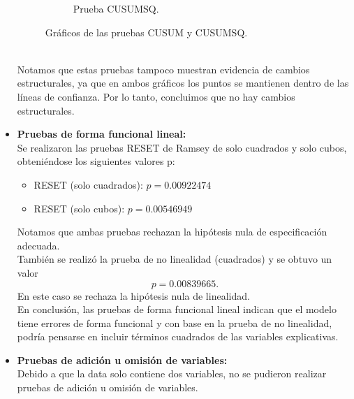 \documentclass[12pt]{article}
\begin{document}
\begin{itemize}
\begin{figure}[h!]
\begin{subfigure}[b]{0.47\textwidth}
            \caption{Prueba CUSUMSQ.}
            \label{fig:cusumsq}
        \end{subfigure}
        \caption{Gráficos de las pruebas CUSUM y CUSUMSQ.}
        \label{fig:cusum_cusumsq}
    \end{figure}\\
    Notamos que estas pruebas tampoco muestran evidencia de cambios estructurales, ya que en ambos gráficos 
    los puntos se mantienen dentro de las líneas de confianza. Por lo tanto, concluimos 
    que no hay cambios estructurales.
    
    \item \textbf{Pruebas de forma funcional lineal:}\\
    Se realizaron las pruebas RESET de Ramsey de solo cuadrados y solo cubos, obteniéndose los siguientes valores p:
    \begin{itemize}
        \item RESET (solo cuadrados): $p = 0.00922474$
        \item RESET (solo cubos): $p = 0.00546949$
    \end{itemize}
    Notamos que ambas pruebas rechazan la hipótesis nula de especificación adecuada.\\
    También se realizó la prueba de no linealidad (cuadrados) y se obtuvo un valor $$p = 0.00839665.$$ 
    En este caso se rechaza la hipótesis nula de linealidad.\\
    En conclusión, las pruebas de forma funcional lineal indican que el modelo tiene errores de forma funcional
    y con base en la prueba de no linealidad, podría pensarse en incluir términos cuadrados de las variables explicativas.


    \item \textbf{Pruebas de adición u omisión de variables:}\\
    Debido a que la data solo contiene dos variables, no se pudieron realizar pruebas de adición u omisión de variables.

\end{itemize}







\printbibliography

\end{document}
